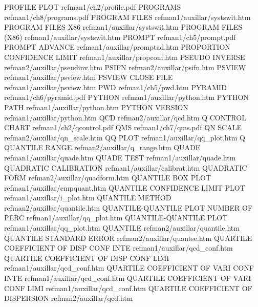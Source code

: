 PROFILE PLOT                            refman1/ch2/profile.pdf
PROGRAMS                                refman1/ch8/programs.pdf
PROGRAM FILES                           refman1/auxillar/systswit.htm
PROGRAM FILES X86                       refman1/auxillar/systswit.htm
PROGRAM FILES (X86)                     refman1/auxillar/systswit.htm
PROMPT                                  refman1/ch5/prompt.pdf
PROMPT ADVANCE                          refman1/auxillar/promptad.htm
PROPORTION CONFIDENCE LIMIT             refman1/auxillar/propconf.htm
PSEUDO INVERSE                          refman2/auxillar/pseudinv.htm
PSIFN                                   refman2/auxillar/psifn.htm
PSVIEW                                  refman1/auxillar/psview.htm
PSVIEW CLOSE FILE                       refman1/auxillar/psview.htm
PWD                                     refman1/ch5/pwd.htm
PYRAMID                                 refman1/ch6/pyramid.pdf
PYTHON                                  refman1/auxillar/python.htm
PYTHON PATH                             refman1/auxillar/python.htm
PYTHON VERSION                          refman1/auxillar/python.htm
QCD                                     refman2/auxillar/qcd.htm
Q CONTROL CHART                         refman1/ch2/qcontrol.pdf
QMS                                     refman1/ch7/qms.pdf
QN SCALE                                refman2/auxillar/qn_scale.htm
QQ PLOT                                 refman1/auxillar/qq_plot.htm
Q QUANTILE RANGE                        refman2/auxillar/q_range.htm
QUADE                                   refman1/auxillar/quade.htm
QUADE TEST                              refman1/auxillar/quade.htm
QUADRATIC CALIBRATION                   refman1/auxillar/calibrat.htm
QUADRATIC FORM                          refman2/auxillar/quadform.htm
QUANTILE BOX PLOT                       refman1/auxillar/empquant.htm
QUANTILE CONFIDENCE LIMIT PLOT          refman1/auxillar/i_plot.htm
QUANTILE METHOD                         refman2/auxillar/quantile.htm
QUANTILE-QUANTILE PLOT NUMBER OF PERC   refman1/auxillar/qq_plot.htm
QUANTILE-QUANTILE PLOT                  refman1/auxillar/qq_plot.htm
QUANTILE                                refman2/auxillar/quantile.htm
QUANTILE STANDARD ERROR                 refman2/auxillar/quantse.htm
QUARTILE COEFFICIENT OF DISP CONF INTE  refman1/auxillar/qcd_conf.htm
QUARTILE COEFFICIENT OF DISP CONF LIMI  refman1/auxillar/qcd_conf.htm
QUARTILE COEFFICIENT OF VARI CONF INTE  refman1/auxillar/qcd_conf.htm
QUARTILE COEFFICIENT OF VARI CONF LIMI  refman1/auxillar/qcd_conf.htm
QUARTILE COEFFICIENT OF DISPERSION      refman2/auxillar/qcd.htm
